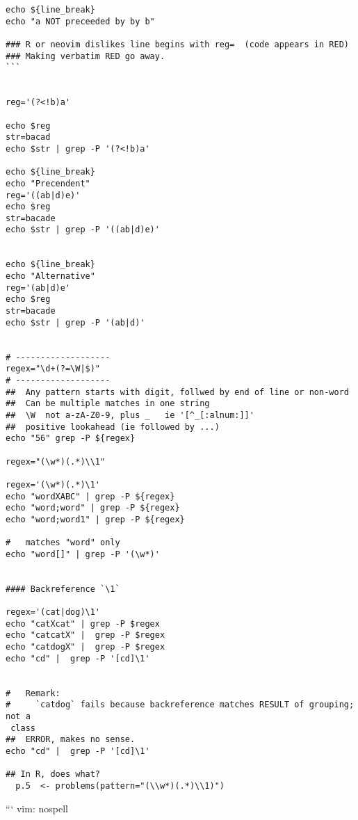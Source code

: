 \begin{verbatim}
echo ${line_break}
echo "a NOT preceeded by by b"

### R or neovim dislikes line begins with reg=  (code appears in RED)
### Making verbatim RED go away.
```


reg='(?<!b)a'   

echo $reg
str=bacad
echo $str | grep -P '(?<!b)a'

echo ${line_break}
echo "Precendent"
reg='((ab|d)e)'
echo $reg
str=bacade
echo $str | grep -P '((ab|d)e)' 


echo ${line_break}
echo "Alternative"
reg='(ab|d)e'
echo $reg
str=bacade
echo $str | grep -P '(ab|d)' 


# -------------------
regex="\d+(?=\W|$)"
# -------------------
##	Any pattern starts with digit, follwed by end of line or non-word
##	Can be multiple matches in one string
##	\W  not a-zA-Z0-9, plus _   ie '[^_[:alnum:]]'
##	positive lookahead (ie followed by ...)
echo "56" grep -P ${regex}

regex="(\w*)(.*)\\1"

regex='(\w*)(.*)\1'
echo "wordXABC" | grep -P ${regex} 
echo "word;word" | grep -P ${regex} 
echo "word;word1" | grep -P ${regex} 

#	matches "word" only
echo "word[]" | grep -P '(\w*)'


#### Backreference `\1`

regex='(cat|dog)\1'
echo "catXcat" | grep -P $regex
echo "catcatX" |  grep -P $regex
echo "catdogX" |  grep -P $regex
echo "cd" |  grep -P '[cd]\1'

 
#	Remark:
#	  `catdog` fails because backreference matches RESULT of grouping; not a
 class
##	ERROR, makes no sense.
echo "cd" |  grep -P '[cd]\1'

## In R, does what?
  p.5  <- problems(pattern="(\\w*)(.*)\\1)")

\end{verbatim}

```
vim: nospell
